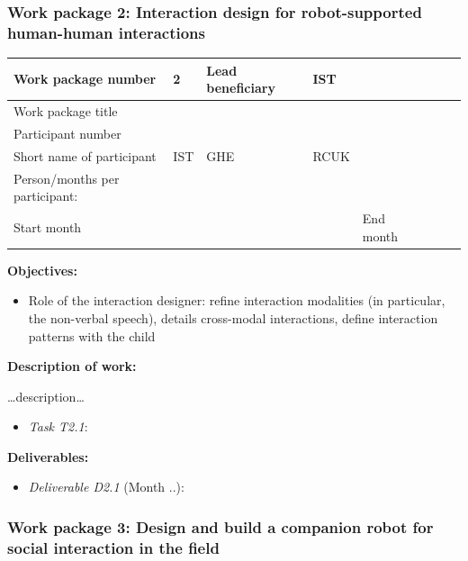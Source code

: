 \documentclass[]{article}
\providecommand{\tightlist}{%
  \setlength{\itemsep}{0pt}\setlength{\parskip}{0pt}}
\begin{document}
\hypertarget{work-package-2-interaction-design-for-robot-supported-human-human-interactions}{%
\subsubsection{Work package 2: Interaction design for robot-supported
human-human
interactions}\label{work-package-2-interaction-design-for-robot-supported-human-human-interactions}}

\begin{longtable}[]{@{}llllllll@{}}
\toprule
Work package number & 2 & Lead beneficiary & IST & & & &\tabularnewline
\midrule
\endhead
Work package title & & & & & & &\tabularnewline
Participant number & & & & & & &\tabularnewline
Short name of participant & IST & GHE & RCUK & & & &\tabularnewline
Person/months per participant: & & & & & & &\tabularnewline
Start month & & & & End month & & &\tabularnewline
\bottomrule
\end{longtable}

\textbf{Objectives:}

\begin{itemize}
\tightlist
\item
  Role of the interaction designer: refine interaction modalities (in
  particular, the non-verbal speech), details cross-modal interactions,
  define interaction patterns with the child
\end{itemize}

\textbf{Description of work:}

\ldots{}description\ldots{}

\begin{itemize}
\tightlist
\item
  \emph{Task T2.1}:
\end{itemize}

\textbf{Deliverables:}

\begin{itemize}
\tightlist
\item
  \emph{Deliverable D2.1} (Month ..):
\end{itemize}

\hypertarget{work-package-3-design-and-build-a-companion-robot-for-social-interaction-in-the-field}{%
\subsubsection{Work package 3: Design and build a companion robot for
social interaction in the
field}\label{work-package-3-design-and-build-a-companion-robot-for-social-interaction-in-the-field}}
\end{document}

